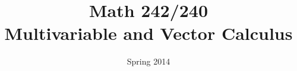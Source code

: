 \documentclass{beamer}
\title[Multivariable Calculus]{Math 242/240 \\ Multivariable and Vector Calculus}
\date{Spring 2014}
\begin{document}
\begin{frame}
  \titlepage
\end{frame}



\begin{small}

%
%
%
%
%
%
%
%
%
%
%
%
%

\end{small}
\end{document}
